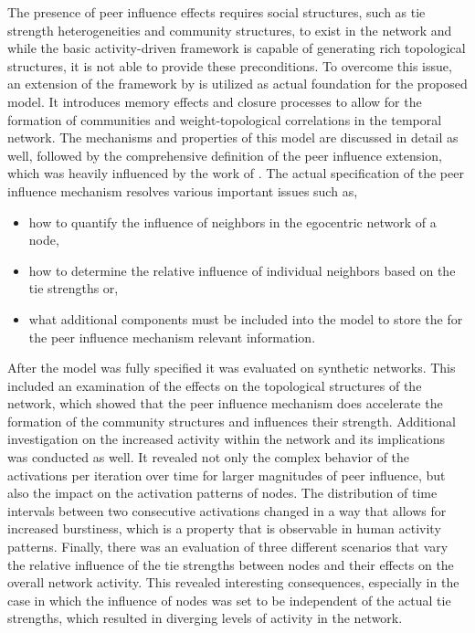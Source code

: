 The presence of peer influence effects requires social structures, such as tie strength heterogeneities and community structures, to exist in the network and while the basic activity-driven framework is capable of generating rich topological structures, it is not able to provide these preconditions.
To overcome this issue, an extension of the framework by \citet{Laurent2015} is utilized as actual foundation for the proposed model.
It introduces memory effects and closure processes to allow for the formation of communities and weight-topological correlations in the temporal network.
The mechanisms and properties of this model are discussed in detail as well, followed by the comprehensive definition of the peer influence extension, which was heavily influenced by the work of \citet{Walk2016}.
The actual specification of the peer influence mechanism resolves various important issues such as,

\begin{itemize}
    \item how to quantify the influence of neighbors in the egocentric network of a node,
    \item how to determine the relative influence of individual neighbors based on the tie strengths or,
    \item what additional components must be included into the model to store the for the peer influence mechanism relevant information.
\end{itemize}

After the model was fully specified it was evaluated on synthetic networks.
This included an examination of the effects on the topological structures of the network, which showed that the peer influence mechanism does accelerate the formation of the community structures and influences their strength.
Additional investigation on the increased activity within the network and its implications was conducted as well.
It revealed not only the complex behavior of the activations per iteration over time for larger magnitudes of peer influence, but also the impact on the activation patterns of nodes.
The distribution of time intervals between two consecutive activations changed in a way that allows for increased burstiness, which is a property that is observable in human activity patterns.
Finally, there was an evaluation of three different scenarios that vary the relative influence of the tie strengths between nodes and their effects on the overall network activity.
This revealed interesting consequences, especially in the case in which the influence of nodes was set to be independent of the actual tie strengths, which resulted in diverging levels of activity in the network.


